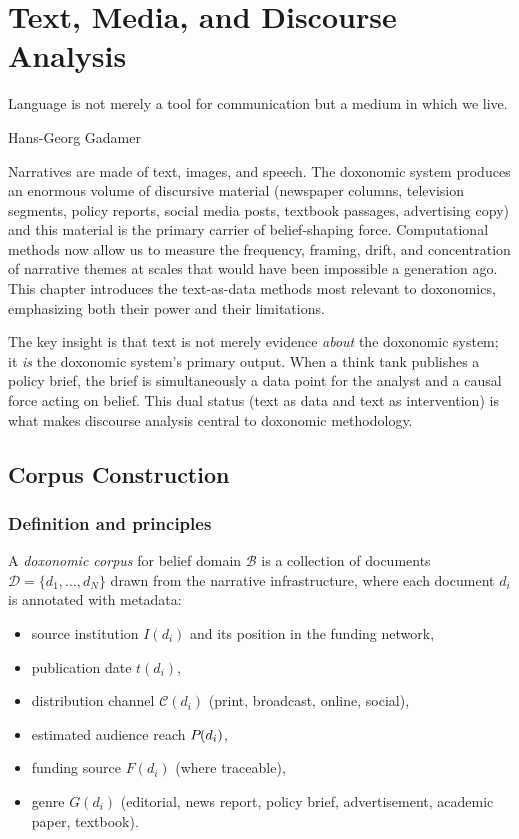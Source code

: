 \chapter{Text, Media, and Discourse Analysis}
\label{ch:text-media}

\epigraph{Language is not merely a tool for communication but a medium in which we live.}{Hans-Georg Gadamer}

\noindent
Narratives are made of text, images, and speech.
The doxonomic system produces an enormous volume of discursive material (newspaper columns, television segments, policy reports, social media posts, textbook passages, advertising copy) and this material is the primary carrier of belief-shaping force.
Computational methods now allow us to measure the frequency, framing, drift, and concentration of narrative themes at scales that would have been impossible a generation ago.
This chapter introduces the text-as-data methods most relevant to doxonomics, emphasizing both their power and their limitations.

The key insight is that text is not merely evidence \emph{about} the doxonomic system; it \emph{is} the doxonomic system's primary output.
When a think tank publishes a policy brief, the brief is simultaneously a data point for the analyst and a causal force acting on belief.
This dual status (text as data and text as intervention) is what makes discourse analysis central to doxonomic methodology.

\section{Corpus Construction}
\label{sec:ch17-corpus}

\subsection{Definition and principles}

\begin{definition}
\label{def:corpus}
A \emph{doxonomic corpus} for belief domain $\mathcal{B}$ is a collection of documents $\mathcal{D} = \{d_1, \ldots, d_N\}$ drawn from the narrative infrastructure, where each document $d_i$ is annotated with metadata:
\begin{itemize}[nosep]
  \item source institution $I(d_i)$ and its position in the funding network,
  \item publication date $t(d_i)$,
  \item distribution channel $\mathcal{C}(d_i)$ (print, broadcast, online, social),
  \item estimated audience reach $P_{}(d_i)$,
  \item funding source $F(d_i)$ (where traceable),
  \item genre $G(d_i)$ (editorial, news report, policy brief, advertisement, academic paper, textbook).
\end{itemize}
\end{definition}

